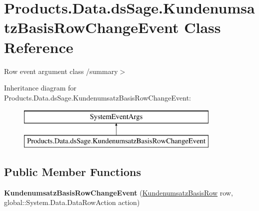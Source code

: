 \hypertarget{class_products_1_1_data_1_1ds_sage_1_1_kundenumsatz_basis_row_change_event}{}\section{Products.\+Data.\+ds\+Sage.\+Kundenumsatz\+Basis\+Row\+Change\+Event Class Reference}
\label{class_products_1_1_data_1_1ds_sage_1_1_kundenumsatz_basis_row_change_event}


Row event argument class /summary$>$  


Inheritance diagram for Products.\+Data.\+ds\+Sage.\+Kundenumsatz\+Basis\+Row\+Change\+Event\+:\begin{figure}[H]
\begin{center}
\leavevmode
\includegraphics[height=2.000000cm]{class_products_1_1_data_1_1ds_sage_1_1_kundenumsatz_basis_row_change_event}
\end{center}
\end{figure}
\subsection*{Public Member Functions}
\begin{DoxyCompactItemize}
\item 
{\bfseries Kundenumsatz\+Basis\+Row\+Change\+Event} (\hyperlink{class_products_1_1_data_1_1ds_sage_1_1_kundenumsatz_basis_row}{Kundenumsatz\+Basis\+Row} row, global\+::\+System.\+Data.\+Data\+Row\+Action action)\hypertarget{class_products_1_1_data_1_1ds_sage_1_1_kundenumsatz_basis_row_change_event_a3d424369e3ab6b6b672163755aa6ee48}{}\label{class_products_1_1_data_1_1ds_sage_1_1_kundenumsatz_basis_row_change_event_a3d424369e3ab6b6b672163755aa6ee48}

\end{DoxyCompactItemize}
